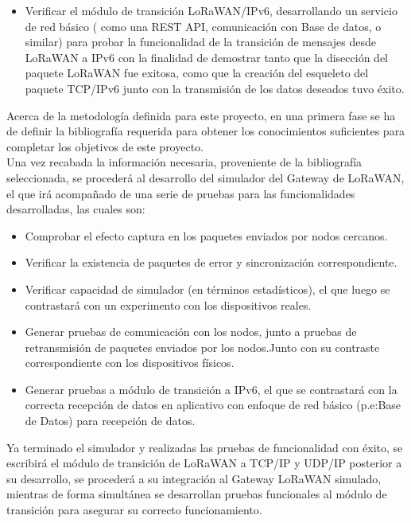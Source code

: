 \begin{justify}
\begin{itemize}
\item Verificar el módulo de transición LoRaWAN/IPv6, desarrollando un servicio de red básico ( como una REST API, comunicación con Base de datos, o similar) para probar la funcionalidad de la transición de mensajes desde LoRaWAN a IPv6 con la finalidad de demostrar tanto que la disección del paquete LoRaWAN fue exitosa, como que la creación del esqueleto del paquete TCP/IPv6 junto con la transmisión de los datos deseados tuvo éxito.
\end{itemize}
Acerca de la metodología definida para este proyecto, en una primera fase se ha de definir la bibliografía requerida para obtener los conocimientos suficientes para completar los objetivos de este proyecto.\\
Una vez recabada la información necesaria, proveniente de la bibliografía seleccionada, se procederá al desarrollo del simulador del Gateway de LoRaWAN, el que irá acompañado de una serie de pruebas para las funcionalidades desarrolladas, las cuales son:\\
\begin{itemize}
\item Comprobar el efecto captura en los paquetes enviados por nodos cercanos. 
\item Verificar la existencia de paquetes de error y sincronización correspondiente.
\item Verificar capacidad de simulador (en términos estadísticos), el que luego se contrastará con un experimento con los dispositivos reales.
\item Generar pruebas de comunicación con los nodos, junto a pruebas de retransmisión de paquetes enviados por los nodos.Junto con su contraste correspondiente con los dispositivos físicos.
\item Generar pruebas a módulo de transición a IPv6, el que se contrastará con la correcta recepción de datos en aplicativo con enfoque de red básico (p.e:Base de Datos) para recepción de datos.
\end{itemize}
Ya terminado el simulador y realizadas las pruebas de funcionalidad con éxito, se escribirá el módulo de transición de LoRaWAN a TCP/IP y UDP/IP posterior a su desarrollo, se procederá a su integración al Gateway LoRaWAN simulado, mientras de forma simultánea se desarrollan pruebas funcionales al módulo de transición para asegurar su correcto funcionamiento.
\end{justify}